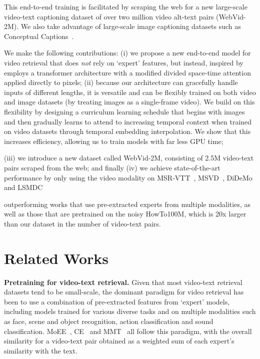 \documentclass[10pt,twocolumn,letterpaper]{article}
\begin{document}
This end-to-end training is facilitated by scraping the web for a new large-scale video-text captioning dataset of over two million video alt-text pairs (WebVid-2M). We also take advantage of large-scale image captioning datasets such as Conceptual Captions~\cite{sharma2018conceptual}.  

We make the following contributions: (i) we propose a new 
end-to-end model for video retrieval that does \textit{not} rely on `expert' features, but instead, inspired by~\cite{bertasius2021spacetime} employs a transformer 
architecture with a modified divided space-time attention applied directly to pixels; 
 (ii) because our architecture can gracefully handle inputs of different lengths, it is versatile and can be flexibly trained on both video and image datasets (by treating images as a single-frame video). We build on this flexibility by designing a curriculum learning schedule that begins with images and then gradually learns to attend to increasing temporal context when trained on video datasets through temporal embedding interpolation. We show that this increases efficiency, allowing us to train models with far less GPU time; 
 
 (iii) we introduce a new dataset called WebVid-2M, consisting of 2.5M video-text pairs scraped from the web; and finally (iv) we achieve state-of-the-art performance by only using the video modality on MSR-VTT~\cite{xu2016msr}, MSVD~\cite{chen2011collecting},
 DiDeMo~\cite{anne2017localizing}
 and LSMDC~\cite{rohrbach2017movie}

outperforming works that use pre-extracted experts from multiple 
modalities, as well as those that are pretrained on the noisy HowTo100M, which is 20x larger than our dataset in the 
number of video-text pairs.
 \section{Related Works}
\noindent\textbf{Pretraining for video-text retrieval.}
Given that most video-text retrieval datasets tend to be small-scale, the dominant paradigm for video retrieval has been to use a combination of pre-extracted features from `expert' models, including models trained for various diverse tasks and on multiple modalities such as face, scene and object recognition, action classification and sound classification. MoEE~\cite{miech18learning},
CE~\cite{Liu19a} and
MMT~\cite{gabeur2020multi} all follow this paradigm, with the overall similarity for a video-text pair obtained as a weighted sum of each expert’s similarity with the text. 
\end{document}
